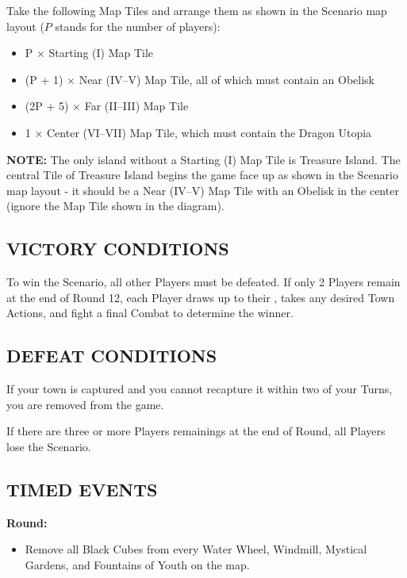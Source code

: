 \begin{multicols*}{2}
Take the following Map Tiles and arrange them as shown in the Scenario map layout ($P$ stands for the number of players):

\begin{itemize}
  \item P × Starting (I) Map Tile
  \item (P + 1) × Near (IV--V) Map Tile, all of which must contain an Obelisk
  \item (2P + 5) × Far (II--III) Map Tile
  \item 1 × Center (VI--VII) Map Tile, which must contain the Dragon Utopia
\end{itemize}


\textbf{\MakeUppercase{Note:}} The only island without a Starting (I) Map Tile is Treasure Island. The central Tile of Treasure Island begins the game face up as shown in the Scenario map layout - it should be a Near (IV--V) Map Tile with an Obelisk in the center (ignore the Map Tile shown in the diagram).

\subsection*{\MakeUppercase{Victory Conditions}}
To win the Scenario, all other Players must be defeated. If only 2 Players remain at the end of Round 12, each Player draws up to their , takes any desired Town Actions, and fight a final Combat to determine the winner.

\subsection*{\MakeUppercase{Defeat Conditions}}
If your town is captured and you cannot recapture it within two of your Turns, you are removed from the game.

If there are three or more Players remainings at the end of  Round, all Players lose the Scenario.

\subsection*{\MakeUppercase{Timed Events}}

\textbf{ Round:}
\begin{itemize}
  \item Remove all Black Cubes from every Water Wheel, Windmill, Mystical Gardens, and Fountains of Youth on the map.
\end{itemize}


\end{multicols*}
